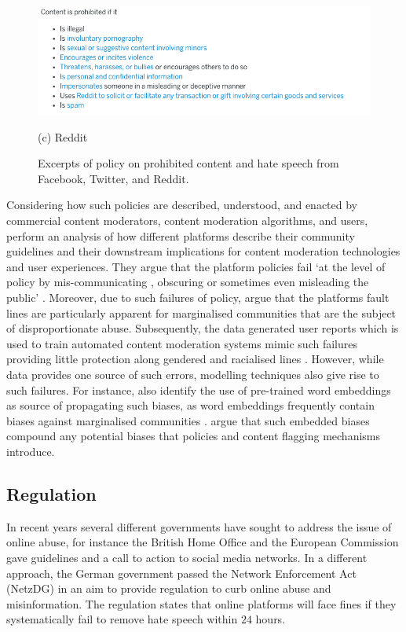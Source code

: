 \begin{figure}
  \centering
  \includegraphics[width=\0.45linewidth]{Chapter2/Figs/Reddit.png}
  \caption*{(c) Reddit}
  \caption{Excerpts of policy on prohibited content and hate speech from Facebook, Twitter, and Reddit.}
  \label{fig:policies}
\end{figure}

Considering how such policies are described, understood, and enacted by commercial content moderators, content moderation algorithms, and users, \citet{Kirtz:2021} perform an analysis of how different platforms describe their community guidelines and their downstream implications for content moderation technologies and user experiences. They argue that the platform policies fail `at the level of policy by mis-communicating , obscuring or sometimes even misleading the public' \citep[p. 5]{Kirtz:2021}. Moreover, due to such failures of policy, \citet{Kirtz:2021} argue that the platforms fault lines are particularly apparent for marginalised communities that are the subject of disproportionate abuse. Subsequently, the data generated user reports which is used to train automated content moderation systems mimic such failures providing little protection along gendered and racialised lines \citep{Kirtz:2021,Waseem:2018}. However, while data provides one source of such errors, modelling techniques also give rise to such failures. For instance, \citet{Kirtz:2021} also identify the use of pre-trained word embeddings as source of propagating such biases, as word embeddings frequently contain biases against marginalised communities \citep{Speer:2017}. \citet{Kirtz:2021} argue that such embedded biases compound any potential biases that policies and content flagging mechanisms introduce.

\subsection{Regulation}
In recent years several different governments have sought to address the issue of online abuse, for instance the British Home Office \citep{HomeOffice:2016} and the European Commission \citep{EUCommission:2016} gave guidelines and a call to action to social media networks.
In a different approach, the German government passed the Network Enforcement Act (NetzDG) \citep{NetzDG:2017} in an aim to provide regulation to curb online abuse and misinformation.
The regulation states that online platforms will face fines if they systematically fail to remove hate speech within $24$ hours.

